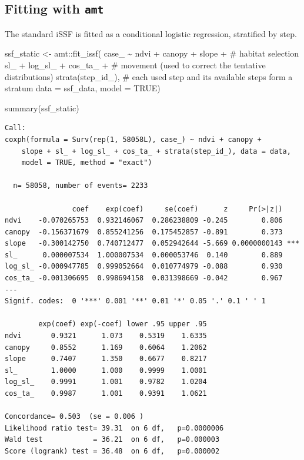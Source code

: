 \documentclass[
  letterpaper,
  DIV=11,
  numbers=noendperiod]{scrartcl}
\newenvironment{Shaded}{\begin{snugshade}}{\end{snugshade}}
\newcommand{\AttributeTok}[1]{\textcolor[rgb]{0.40,0.45,0.13}{#1}}
\newcommand{\CommentTok}[1]{\textcolor[rgb]{0.37,0.37,0.37}{#1}}
\newcommand{\ConstantTok}[1]{\textcolor[rgb]{0.56,0.35,0.01}{#1}}
\newcommand{\FunctionTok}[1]{\textcolor[rgb]{0.28,0.35,0.67}{#1}}
\newcommand{\NormalTok}[1]{\textcolor[rgb]{0.00,0.23,0.31}{#1}}
\newcommand{\OtherTok}[1]{\textcolor[rgb]{0.00,0.23,0.31}{#1}}
\newcommand{\SpecialCharTok}[1]{\textcolor[rgb]{0.37,0.37,0.37}{#1}}
\begin{document}
\subsection{\texorpdfstring{Fitting with
\texttt{amt}}{Fitting with amt}}\label{fitting-with-amt}

The standard iSSF is fitted as a conditional logistic regression,
stratified by step.

\begin{Shaded}
\begin{Highlighting}[]
\NormalTok{ssf\_static }\OtherTok{\textless{}{-}}\NormalTok{ amt}\SpecialCharTok{::}\FunctionTok{fit\_issf}\NormalTok{(}
\NormalTok{  case\_ }\SpecialCharTok{\textasciitilde{}}\NormalTok{ ndvi }\SpecialCharTok{+}\NormalTok{ canopy }\SpecialCharTok{+}\NormalTok{ slope }\SpecialCharTok{+}      \CommentTok{\# habitat selection}
\NormalTok{    sl\_ }\SpecialCharTok{+}\NormalTok{ log\_sl\_ }\SpecialCharTok{+}\NormalTok{ cos\_ta\_ }\SpecialCharTok{+}          \CommentTok{\# movement (used to correct the tentative distributions)}
    \FunctionTok{strata}\NormalTok{(step\_id\_),                  }\CommentTok{\# each used step and its available steps form a stratum}
  \AttributeTok{data =}\NormalTok{ ssf\_data, }\AttributeTok{model =} \ConstantTok{TRUE}\NormalTok{)}

\FunctionTok{summary}\NormalTok{(ssf\_static)}
\end{Highlighting}
\end{Shaded}

\begin{verbatim}
Call:
coxph(formula = Surv(rep(1, 58058L), case_) ~ ndvi + canopy + 
    slope + sl_ + log_sl_ + cos_ta_ + strata(step_id_), data = data, 
    model = TRUE, method = "exact")

  n= 58058, number of events= 2233 

                coef    exp(coef)     se(coef)      z     Pr(>|z|)    
ndvi    -0.070265753  0.932146067  0.286238809 -0.245        0.806    
canopy  -0.156371679  0.855241256  0.175452857 -0.891        0.373    
slope   -0.300142750  0.740712477  0.052942644 -5.669 0.0000000143 ***
sl_      0.000007534  1.000007534  0.000053746  0.140        0.889    
log_sl_ -0.000947785  0.999052664  0.010774979 -0.088        0.930    
cos_ta_ -0.001306695  0.998694158  0.031398669 -0.042        0.967    
---
Signif. codes:  0 '***' 0.001 '**' 0.01 '*' 0.05 '.' 0.1 ' ' 1

        exp(coef) exp(-coef) lower .95 upper .95
ndvi       0.9321      1.073    0.5319    1.6335
canopy     0.8552      1.169    0.6064    1.2062
slope      0.7407      1.350    0.6677    0.8217
sl_        1.0000      1.000    0.9999    1.0001
log_sl_    0.9991      1.001    0.9782    1.0204
cos_ta_    0.9987      1.001    0.9391    1.0621

Concordance= 0.503  (se = 0.006 )
Likelihood ratio test= 39.31  on 6 df,   p=0.0000006
Wald test            = 36.21  on 6 df,   p=0.000003
Score (logrank) test = 36.48  on 6 df,   p=0.000002
\end{verbatim}
\end{document}
